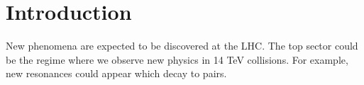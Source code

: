 \section{Introduction}

New phenomena are expected to be discovered at the LHC. The
top sector could be the regime where we observe new physics in
 14 TeV collisions. For example, new 
resonances could appear which decay to \ttbar pairs.
